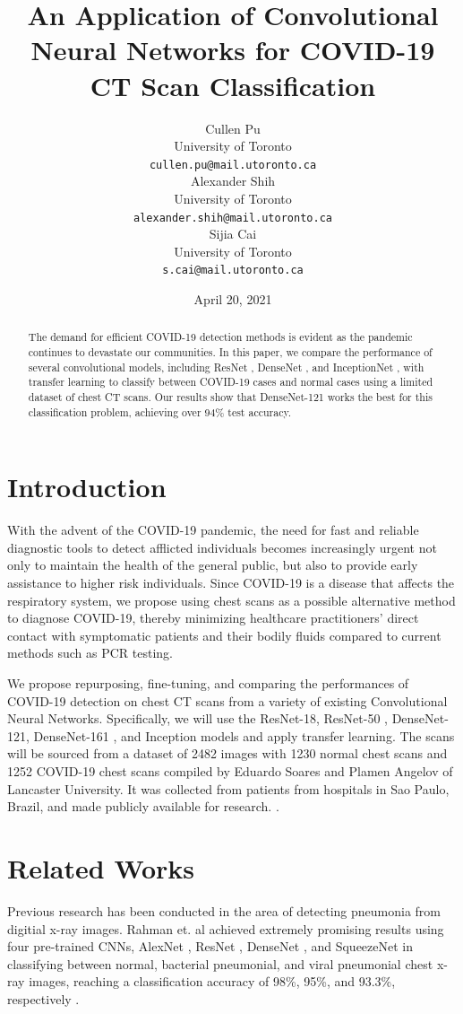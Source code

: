 \documentclass{article}
\title{An Application of Convolutional Neural Networks for COVID-19 CT Scan Classification}
\author{
  Cullen Pu \\
  University of Toronto \\
  \texttt{cullen.pu@mail.utoronto.ca} \\
  \And
  Alexander Shih \\
  University of Toronto \\
  \texttt{alexander.shih@mail.utoronto.ca} \\
  \And
  Sijia Cai \\
  University of Toronto \\
  \texttt{s.cai@mail.utoronto.ca} \\
}
\date{April 20, 2021}
\begin{document}
\maketitle

\begin{abstract}
    The demand for efficient COVID-19 detection methods is evident as the pandemic continues to devastate our communities. In this paper, we compare the performance of several convolutional models, including ResNet \cite{ResNet}, DenseNet \cite{DenseNet}, and InceptionNet \cite{Inception}, with transfer learning to classify between COVID-19 cases and normal cases using a limited dataset of chest CT scans. Our results show that DenseNet-121 works the best for this classification problem, achieving over 94\% test accuracy.
\end{abstract}

\section{Introduction}
With the advent of the COVID-19 pandemic, the need for fast and reliable diagnostic tools to detect afflicted individuals becomes increasingly urgent not only to maintain the health of the general public, but also to provide early assistance to higher risk individuals. Since COVID-19 is a disease that affects the respiratory system, we propose using chest scans as a possible alternative method to diagnose COVID-19, thereby minimizing healthcare practitioners' direct contact with symptomatic patients and their bodily fluids compared to current methods such as PCR testing.

We propose repurposing, fine-tuning, and comparing the performances of COVID-19 detection on chest CT scans from a variety of existing Convolutional Neural Networks. Specifically, we will use the ResNet-18, ResNet-50 \cite{ResNet}, DenseNet-121, DenseNet-161 \cite{DenseNet}, and Inception \cite{Inception} models and apply transfer learning. The scans will be sourced from a dataset of 2482 images with 1230 normal chest scans and 1252 COVID-19 chest scans compiled by Eduardo Soares and Plamen Angelov of Lancaster University. It was collected from patients from hospitals in Sao Paulo, Brazil, and made publicly available for research. \cite{PlamenEduardo}.

\section{Related Works}
Previous research has been conducted in the area of detecting pneumonia from digitial x-ray images. Rahman et. al achieved extremely promising results using four pre-trained CNNs, AlexNet \cite{AlexNet}, ResNet \cite{ResNet}, DenseNet \cite{DenseNet}, and SqueezeNet \cite{SqueezeNet} in classifying between normal, bacterial pneumonial, and viral pneumonial chest x-ray images, reaching a classification accuracy of 98\%, 95\%, and 93.3\%, respectively \cite{Rahman_2020}.
\end{document}
